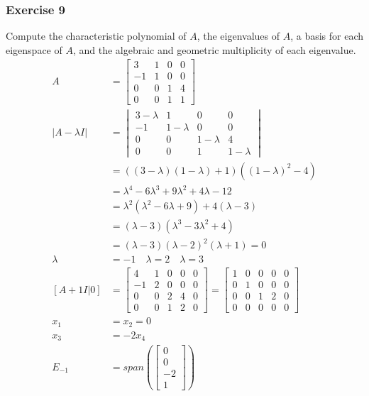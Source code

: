 \documentclass{math}
\begin{document}
\subsubsection*{Exercise 9}
Compute the characteristic polynomial of \( A \), the eigenvalues of \( A \),
a basis for each eigenspace of \( A \), and the algebraic and geometric
multiplicity of each eigenvalue.
\begin{align*}
  A &= \begin{bmatrix}
    3 & 1 & 0 & 0 \\
    -1 & 1 & 0 & 0 \\
    0 & 0 & 1 & 4 \\
    0 & 0 & 1 & 1
  \end{bmatrix} \\
  |A-\lambda I| &= \begin{vmatrix}
    3-\lambda & 1 & 0 & 0 \\
    -1 & 1-\lambda & 0 & 0 \\
    0 & 0 & 1-\lambda & 4 \\
    0 & 0 & 1 & 1-\lambda
  \end{vmatrix} \\
  &= ((3-\lambda)(1-\lambda)+1)((1-\lambda)^2-4) \\
  &= \lambda^4-6\lambda^3+9\lambda^2+4\lambda-12 \\
  &= \lambda^2(\lambda^2-6\lambda+9)+4(\lambda-3) \\
  &= (\lambda-3)(\lambda^3-3\lambda^2+4) \\
  &= (\lambda-3)(\lambda-2)^2(\lambda+1) = 0 \\
  \lambda &= -1 \quad \lambda = 2 \quad \lambda = 3 \\
  [A+1I|0] &= \begin{bmatrix}
    4 & 1 & 0 & 0 & 0 \\
    -1 & 2 & 0 & 0 & 0 \\
    0 & 0 & 2 & 4 & 0 \\
    0 & 0 & 1 & 2 & 0
  \end{bmatrix} = \begin{bmatrix}
    1 & 0 & 0 & 0 & 0 \\
    0 & 1 & 0 & 0 & 0 \\
    0 & 0 & 1 & 2 & 0 \\
    0 & 0 & 0 & 0 & 0
  \end{bmatrix} \\
  x_1 &= x_2 = 0 \\
  x_3 &= -2x_4 \\
  E_{-1} &= span\left(\begin{bmatrix}0 \\ 0 \\ -2 \\ 1\end{bmatrix}\right) \\

\end{align*}
\end{document}
